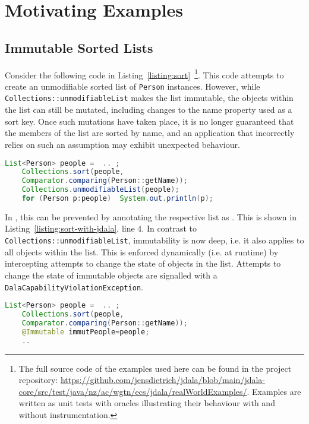 \section{Motivating Examples}

\subsection{Immutable Sorted Lists}	


Consider the following code in Listing~\ref{listing:sort}~\footnote{The full source code of the examples used here can be found in the project repository: \url{https://github.com/jensdietrich/jdala/blob/main/jdala-core/src/test/java/nz/ac/wgtn/ecs/jdala/realWorldExamples/}. Examples are written as unit tests with oracles illustrating their behaviour with and without \jdala instrumentation.}. This code attempts to create an unmodifiable sorted list of \texttt{Person} instances. 
However, while \texttt{Collections::unmodifiableList} makes the list immutable, the objects within the list can still be mutated, including changes to the name property used as a sort key.  Once such mutations 
have taken place, it is no longer guaranteed that the members of the list are sorted by name, and an application that incorrectly relies on such an assumption may exhibit unexpected behaviour.

\begin{lstlisting}[language=Java, caption=Erroneous Attempt to Make a Sorted List Immutable, label=listing:sort]
	List<Person> people =  .. ;
	Collections.sort(people,
	Comparator.comparing(Person::getName));
	Collections.unmodifiableList(people);
	for (Person p:people)  System.out.println(p);
\end{lstlisting}



In \jdala ,  this can be prevented by annotating the respective list as \Immutable. This is shown in Listing~\ref{listing:sort-with-jdala}, line 4. In contrast to \texttt{Collections::unmodifiableList}, immutability is now deep, i.e. it also applies to all objects within the list. This is enforced dynamically (i.e. at runtime) by intercepting attempts to change the state of objects in the list.  Attempts to change the state of immutable objects are signalled with a \texttt{DalaCapabilityViolationException}. 

\begin{lstlisting}[language=Java, caption=Make a Sorted List Immutable with \jdala, label=listing:sort-with-jdala]
	List<Person> people =  .. ;
	Collections.sort(people,
	Comparator.comparing(Person::getName));
	@Immutable immutPeople=people;
	..
\end{lstlisting}


